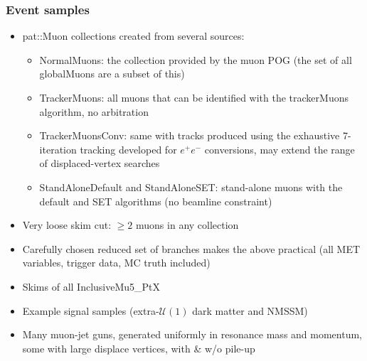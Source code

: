 \documentclass[compress]{beamer}
\begin{document}
\begin{frame}
\frametitle{Event samples}
\begin{itemize}
\item pat::Muon collections created from several sources:
\begin{itemize}
\item NormalMuons: the collection provided by the muon POG (the set of all globalMuons are a subset of this)
\item TrackerMuons: all muons that can be identified with the trackerMuons algorithm, no arbitration
\item TrackerMuonsConv: same with tracks produced using the exhaustive
  7-iteration tracking developed for $e^+e^-$ conversions, may extend
  the range of displaced-vertex searches
\item StandAloneDefault and StandAloneSET: stand-alone muons with the default and SET algorithms (no beamline constraint)
\end{itemize}

\item Very loose skim cut: $\ge 2$ muons in any collection

\item Carefully chosen reduced set of branches makes the above practical (all MET variables, trigger data, MC truth included)

\item Skims of all InclusiveMu5\_PtX

\item Example signal samples (extra-$\mathcal{U}(1)$ dark matter and NMSSM)

\item Many muon-jet guns, generated uniformly in resonance mass and
  momentum, some with large displace vertices, with \& w/o pile-up
\end{itemize}
\end{frame}
\end{document}
